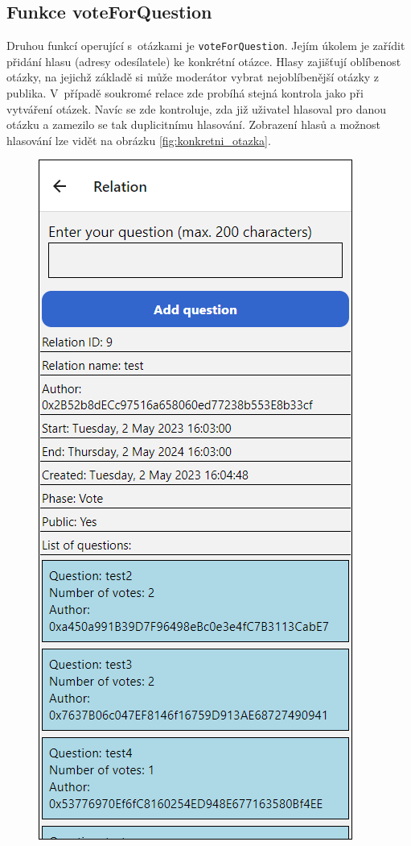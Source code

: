 \subsection*{Funkce voteForQuestion}
Druhou funkcí operující s~otázkami je \texttt{voteForQuestion}. Jejím úkolem je zařídit přidání hlasu (adresy odesílatele) ke konkrétní otázce. Hlasy zajišťují oblíbenost otázky, na jejichž základě si může moderátor vybrat nejoblíbenější otázky z publika. V~případě soukromé relace zde probíhá stejná kontrola jako při vytváření otázek. Navíc se zde kontroluje, zda již uživatel hlasoval pro danou otázku a zamezilo se tak duplicitnímu hlasování. Zobrazení hlasů a možnost hlasování lze vidět na obrázku \ref{fig:konkretni_otazka}.

\begin{figure}
\centering
\begin{minipage}{.5\textwidth}
  \centering
  \includegraphics[width=.9\linewidth]{obrazky/relace_s_otazkami.png}

\end{minipage}
\end{figure}
